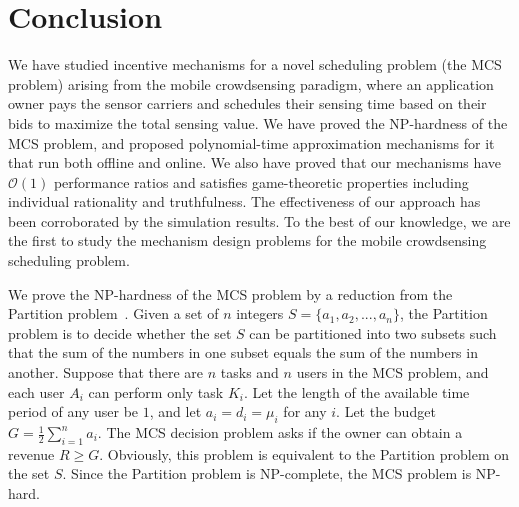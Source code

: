 \documentclass[10pt,journal,compsoc]{IEEEtran}
\begin{document}
\section{Conclusion} \label{sec:con}
We have studied incentive mechanisms for a novel scheduling problem (the MCS problem) arising from the mobile crowdsensing paradigm, where an application owner pays the sensor carriers and schedules their sensing time based on their bids to maximize the total sensing value. We have proved the NP-hardness of the MCS problem, and proposed polynomial-time approximation mechanisms for it that run both offline and online. We also have proved that our mechanisms have $\mathcal{O}(1)$ performance ratios and satisfies game-theoretic properties including individual rationality and truthfulness. The effectiveness of our approach has been corroborated by the simulation results. To the best of our knowledge, we are the first to study the mechanism design problems for the mobile crowdsensing scheduling problem.





\appendix
\begin{IEEEproof}
We prove the NP-hardness of the MCS problem by a reduction from the Partition problem~\cite{Garey1990}. Given a set of $n$ integers $S=\{a_1,a_2,...,a_n\}$, the Partition problem is to decide whether the set $S$ can be partitioned into two subsets such that the sum of the numbers in one subset equals the sum of the numbers in another. Suppose that there are $n$ tasks and $n$ users in the MCS problem, and each user $A_i$ can perform only task $K_i$. Let the length of the available time period of any user be $1$, and let $a_i=d_i=\mu_i$ for any $i$. Let the budget $G=\frac{1}{2}\sum_{i=1}^n a_i$. The MCS decision problem asks if the owner can obtain a revenue $R \ge G$. Obviously, this problem is equivalent to the Partition problem on the set $S$. Since the Partition problem is NP-complete, the MCS problem is NP-hard.
\end{IEEEproof}
\end{document}
